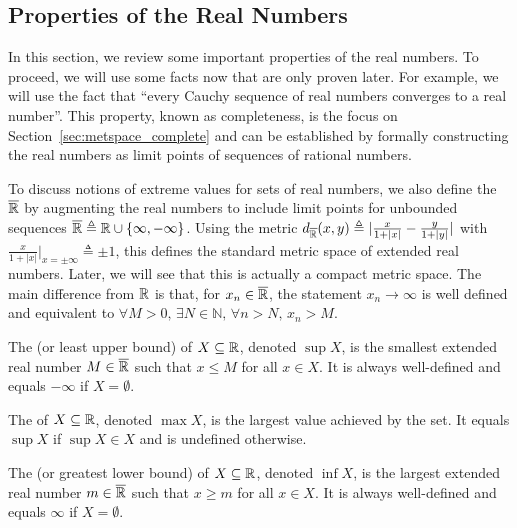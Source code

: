 \subsection{Properties of the Real Numbers}

In this section, we review some important properties of the real numbers.
To proceed, we will use some facts now that are only proven later.
For example, we will use the fact that ``every Cauchy sequence of real numbers converges to a real number''.
This property, known as completeness, is the focus on Section~\ref{sec:metspace_complete} and can be established by formally constructing the real numbers as limit points of sequences of rational numbers.

To discuss notions of extreme values for sets of real numbers, we also define the  $\overline{\mathbb{R}}$ by augmenting the real numbers to include limit points for unbounded sequences $\overline{\mathbb{R}} \triangleq \mathbb{R} \cup \{ \infty,-\infty\}$.
Using the metric $d_{\overline{\mathbb{R}}} (x,y) \triangleq |\frac{x}{1+|x|} - \frac{y}{1+|y|}|$ with $\frac{x}{1+|x|}|_{x = \pm \infty} \triangleq \pm 1$, this defines the standard metric space of extended real numbers.
Later, we will see that this is actually a compact metric space.
The main difference from $\mathbb{R}$ is that, for  $x_n \in \overline{\mathbb{R}}$, the statement  $x_n \to \infty$ is well defined and equivalent to $\forall M>0, \, \exists N\in \mathbb{N}, \, \forall n>N, \, x_n > M$.
\begin{definition}
The  (or least upper bound) of $X\subseteq \mathbb{R}$, denoted $\sup X$, is the smallest extended real number $M \in \overline{\mathbb{R}}$ such that $x\leq M$ for all $x\in X$.
It is always well-defined and equals $-\infty$ if $X=\emptyset$.
\end{definition}

\begin{definition}
The  of $X\subseteq \mathbb{R}$, denoted $\max X$, is the largest value achieved by the set.
It equals $\sup X$ if $\sup X \in X$ and is undefined otherwise.
\end{definition}

\begin{definition}
The  (or greatest lower bound) of $X\subseteq \mathbb{R}$, denoted $\inf X$, is the largest extended real number $m \in \overline{\mathbb{R}}$ such that $x\geq m$ for all $x\in X$.
It is always well-defined and equals $\infty$ if $X=\emptyset$.
\end{definition}

